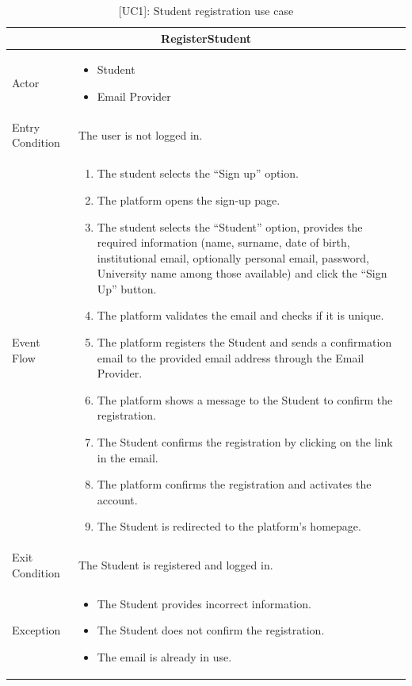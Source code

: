 \begin{table}[H]
    \centering
    \begin{tabular}{|p{3cm}|p{12cm}|}
    \hline
    \multicolumn{2}{|c|}{\textbf{RegisterStudent}} \\ \hline
    Actor & 
    \begin{itemize}
        \item Student
        \item Email Provider
    \end{itemize} \\ \hline
    Entry Condition & The user is not logged in. \\ \hline
    Event Flow & 
    \begin{enumerate}         
        \item The student selects the “Sign up” option.
        \item The platform opens the sign-up page.
        \item The student selects the “Student” option, provides the required information (name, surname, date of birth, institutional email, optionally personal email, password, University name among those available) and click the “Sign Up” button.
        \item The platform validates the email and checks if it is unique.
        \item The platform registers the Student and sends a confirmation email to the provided email address through the Email Provider.
        \item The platform shows a message to the Student to confirm the registration.
        \item The Student confirms the registration by clicking on the link in the email.
        \item The platform confirms the registration and activates the account.
        \item The Student is redirected to the platform's homepage.
    \end{enumerate} \\ \hline
    Exit Condition & The Student is registered and logged in. \\ \hline
    Exception & 
    \begin{itemize}
        \item The Student provides incorrect information.
        \item The Student does not confirm the registration.
        \item The email is already in use.
    \end{itemize} \\ \hline
    \end{tabular}
    \caption{[UC1]: Student registration use case}
    \label{tab:UC1}
\end{table}
